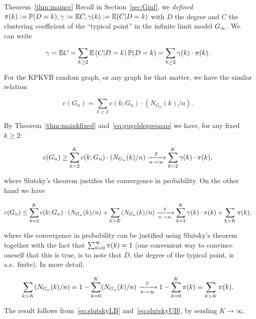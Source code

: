\begin{proofof}{Theorem~\ref{thm:maincc}}
Recall in Section~\ref{sec:Ginf},  we {\em defined} ${\pi}(k) := \mathbb{P}(D=k), \gamma := {\mathbb E} C, \gamma(k) := {\mathbb E}(C|D=k)$ with $D$ the degree
and $C$ the clustering coefficient of the ``typical point'' in the infinite limit model $G_{\infty}$. We can write

$$ \gamma = {\mathbb E} C = \sum_{k\geq 2} {\mathbb E}\left( C | D=k \right) \mathbb{P}( D=k ) = \sum_{k\geq 2} \gamma(k) \cdot {\pi}(k). $$

For the KPKVB random graph, or any graph for that matter, we have the similar relation

$$ c(G_n) = \sum_{k\geq 2} c(k;G_n) \cdot (N_{G_n}(k)/n). $$


By Theorem~\ref{thm:mainkfixed} and~\eqref{eq:gugeldegseqaap} we have, for any fixed $k\geq 2$:

\begin{equation}\label{eq:slutskyUB} 
 c(G_n) \geq \sum_{k=2}^K c(k;G_n) \cdot (N_{G_n}(k)/n) \xrightarrow[n\to\infty]{\mathbb{P}} \sum_{k=2}^K \gamma(k)\cdot {\pi}(k), 
\end{equation}

\noindent
where Slutsky's theorem justifies the convergence in probability.
On the other hand we have 

\begin{equation}\label{eq:slutskyLB} 
c(G_n) \leq \sum_{k=2}^K c(k;G_n) \cdot (N_{G_n}(k)/n) + \sum_{k>K} (N_{G_n}(k)/n)
\xrightarrow[n\to\infty]{\mathbb{P}} \sum_{k=2}^K \gamma(k)\cdot {\pi}(k) + \sum_{k>K} {\pi}(k), 
\end{equation}

\noindent
where the convergence in probability can be justified using Slutsky's theorem together 
with the fact that $\sum_{k=0}^\infty {\pi}(k) = 1$ (one convenient way to convince oneself that this is true, is to note that 
$D$, the degree of the typical point, is a.s.~finite). In more detail, 

$$\sum_{k>K} (N_{G_n}(k)/n) 
= 1 - \sum_{k=0}^K (N_{G_n}(k)/n) \xrightarrow[n\to\infty]{\mathbb{P}} 1 - \sum_{k=0}^K {\pi}(k) = \sum_{k>K} {\pi}(k). $$

The result follows from~\eqref{eq:slutskyLB} and~\eqref{eq:slutskyUB}, by sending $K\to\infty$. 
\end{proofof}




